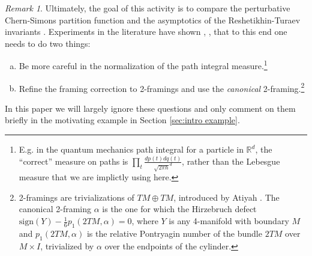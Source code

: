 \documentclass[11pt,a4paper]{amsart}
\theoremstyle{plain} %
\theoremstyle{definition}
\theoremstyle{remark}
\newtheorem{rem}[thm]{Remark}
\newcommand{\R}{\mathbb{R}}
\newcommand{\mr}{\mathrm}
\begin{document}
         \begin{rem}\label{rem: def Z pert normalization}
        Ultimately, the goal of this activity  
        is to compare the perturbative Chern-Simons partition function and the asymptotics of the Reshetikhin-Turaev invariants \cite{Reshetikhin1991}. Experiments in the literature have shown \cite{Freed1991}, \cite{Jeffrey1992}, \cite{Rozansky1995} that to this end one needs to do two things: 
        \begin{enumerate}[a)]
        \item 
        Be more careful in the normalization of the path integral measure.\footnote{E.g. in the quantum mechanics path integral for a particle in $\R^d$, the ``correct''  measure on paths is $\prod_t \frac{dp(t)dq(t)}{\sqrt{2\pi\hbar}^d}$, rather than the Lebesgue measure that we are implictly using here.} 
        \item Refine the framing correction to 2-framings and use the \emph{canonical} 2-framing.\footnote{2-framings are trivializations of $TM \oplus TM$, introduced by Atiyah \cite{Atiyah1990}. The canonical 2-framing $\alpha$ is the one for which the Hirzebruch defect $\mr{sign}(Y) - \frac16p_1(2TM,\alpha) =0$, where $Y$ is any 4-manifold with boundary $M$ and $p_1(2TM,\alpha)$ is the relative Pontryagin number of the bundle $2TM$ over $M \times I$, trivialized by $\alpha$ over the endpoints of the cylinder.  }
        \end{enumerate} 
        In this paper we will largely ignore these questions and only comment on them briefly in the motivating example in Section \ref{sec:intro example}. 
  
\end{rem}


\end{document}
